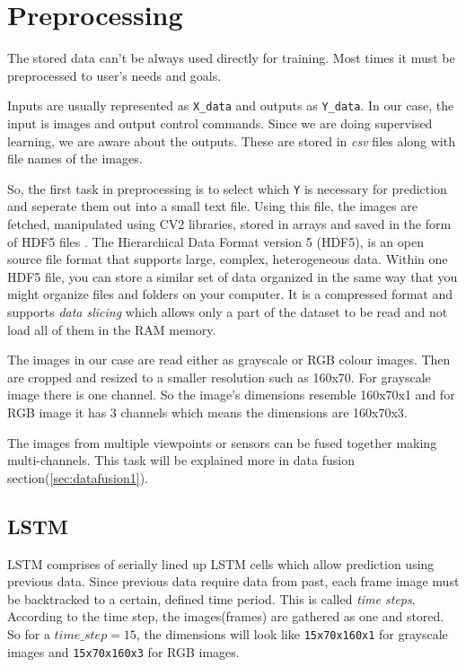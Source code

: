 \section{Preprocessing}
The stored data can't be always used directly for training. Most times it must be
preprocessed to user's needs and goals.

Inputs are usually represented as \texttt{X\_{data}} and outputs as \texttt{Y\_{data}}. In our case, the input is images and output control commands.
Since we are doing supervised learning, we are aware about the outputs. These are stored in
\textit{csv} files along with file names of the images.

So, the first task in preprocessing is to select which \texttt{Y} is necessary for prediction
and seperate them out into a small text file. Using this file, the images are fetched,
manipulated using CV2 libraries, stored in arrays and saved in the form of HDF5 files
\cite{hdf5file}. The Hierarchical Data Format version 5 (HDF5), is an open source file format
that supports large, complex, heterogeneous data. Within one HDF5 file, you can store a similar set of data organized in the same way that you might organize files and folders on your computer.
It is a compressed format and supports \textit{data slicing} which allows only a part of
the dataset to be read and not load all of them in the RAM memory.

The images in our case are read either as grayscale or RGB colour images. Then are cropped
and resized to a smaller resolution such as 160x70. For grayscale image there is one
channel. So the image's dimensions resemble 160x70x1 and for RGB image it has 3 channels
which means the dimensions are 160x70x3.

The images from multiple viewpoints or sensors can be fused together making
multi-channels. This task will be explained more in data fusion
section(\ref{sec:datafusion1}).

\subsection{LSTM}
LSTM comprises of serially lined up LSTM cells which allow prediction using previous
data. Since previous data require data from past, each frame image must be backtracked to
a certain, defined time period. This is called \textit{time steps}. According to the time
step, the images(frames) are gathered as one and stored. So for a $time\_step = 15$, the
dimensions will look like \texttt{15x70x160x1} for grayscale images and \texttt{15x70x160x3} for RGB
images.

